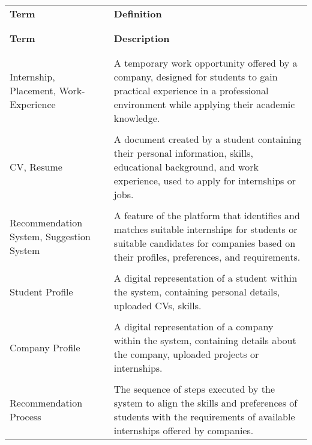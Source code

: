 \begin{longtable}{p{}p{}}
    \textbf{\large Term} & \textbf{\large Definition} \\
    \vspace{0.5em}\\
    \hline
    \vspace{0.5em}\\
    \endfirsthead
    \textbf{\large Term} & \textbf{\large Description} \\
    \vspace{0.5em}\\
    \hline
    \vspace{0.5em}\\
    \endhead
    
    Internship, Placement, Work-Experience & A temporary work opportunity offered by a company, designed
    for students to gain practical experience in a professional environment while applying their academic
    knowledge. \\
    \vspace{0.5em}\\
    CV, Resume & A document created by a student containing their personal information, skills,
    educational background, and work experience, used to apply for internships or jobs. \\
    \vspace{0.5em}\\
    Recommendation System, Suggestion System & A feature of the platform that identifies and matches
    suitable internships for students or suitable candidates for companies based on their profiles,
    preferences, and requirements. \\
    \vspace{0.5em}\\
    Student Profile & A digital representation of a student within the system, containing personal
    details, uploaded CVs, skills. \\
    \vspace{0.5em}\\
    Company Profile & A digital representation of a company within the system, containing details
    about the company, uploaded projects or internships. \\
    \vspace{0.5em}\\
    Recommendation Process & The sequence of steps executed by the system to align the skills and
    preferences of students with the requirements of available internships offered by companies. \\

\end{longtable}
